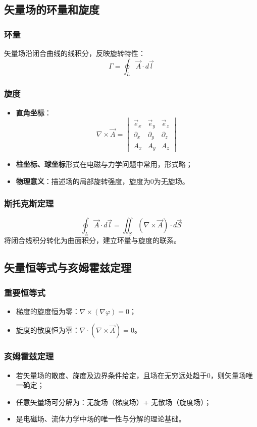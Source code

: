 \subsection{矢量场的环量和旋度}
\subsubsection{环量}
矢量场沿闭合曲线的线积分，反映旋转特性：
\[
\Gamma = \oint_L \vec{A} \cdot d\vec{l}
\]

\subsubsection{旋度}
\begin{itemize}
    \item \textbf{直角坐标}：
    \[
    \nabla \times \vec{A} = \begin{vmatrix}
    \vec{e}_x & \vec{e}_y & \vec{e}_z \\
    \partial_x & \partial_y & \partial_z \\
    A_x & A_y & A_z
    \end{vmatrix}
    \]
    \item \textbf{柱坐标、球坐标}形式在电磁与力学问题中常用，形式略；
    \item \textbf{物理意义}：描述场的局部旋转强度，旋度为0为无旋场。
\end{itemize}

\subsubsection{斯托克斯定理}
\[
\oint_L \vec{A} \cdot d\vec{l} = \iint_S (\nabla \times \vec{A}) \cdot d\vec{S}
\]
将闭合线积分转化为曲面积分，建立环量与旋度的联系。

\subsection{矢量恒等式与亥姆霍兹定理}
\subsubsection{重要恒等式}
\begin{itemize}
    \item 梯度的旋度恒为零：$\nabla \times (\nabla \varphi) = 0$；
    \item 旋度的散度恒为零：$\nabla \cdot (\nabla \times \vec{A}) = 0$。
\end{itemize}

\subsubsection{亥姆霍兹定理}
\begin{itemize}
    \item 若矢量场的散度、旋度及边界条件给定，且场在无穷远处趋于0，则矢量场唯一确定；
    \item 任意矢量场可分解为：无旋场（梯度场）+ 无散场（旋度场）；
    \item 是电磁场、流体力学中场的唯一性与分解的理论基础。
\end{itemize}

